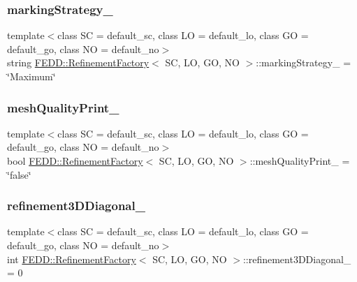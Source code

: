 \subsubsection{\texorpdfstring{marking\+Strategy\+\_\+}{markingStrategy\_}}
{\footnotesize\ttfamily template$<$class SC  = default\+\_\+sc, class LO  = default\+\_\+lo, class GO  = default\+\_\+go, class NO  = default\+\_\+no$>$ \\
string \hyperlink{classFEDD_1_1RefinementFactory}{F\+E\+D\+D\+::\+Refinement\+Factory}$<$ SC, LO, GO, NO $>$\+::marking\+Strategy\+\_\+ = \char`\"{}Maximum\char`\"{}}

\mbox{\label{classFEDD_1_1RefinementFactory_a74d0dd46b30f83f868cd749d28375a42}} 
\subsubsection{\texorpdfstring{mesh\+Quality\+Print\+\_\+}{meshQualityPrint\_}}
{\footnotesize\ttfamily template$<$class SC  = default\+\_\+sc, class LO  = default\+\_\+lo, class GO  = default\+\_\+go, class NO  = default\+\_\+no$>$ \\
bool \hyperlink{classFEDD_1_1RefinementFactory}{F\+E\+D\+D\+::\+Refinement\+Factory}$<$ SC, LO, GO, NO $>$\+::mesh\+Quality\+Print\+\_\+ = \char`\"{}false\char`\"{}}

\mbox{\label{classFEDD_1_1RefinementFactory_a7466053f06c1d52d6fb2c58db06b7a71}} 
\subsubsection{\texorpdfstring{refinement3\+D\+Diagonal\+\_\+}{refinement3DDiagonal\_}}
{\footnotesize\ttfamily template$<$class SC  = default\+\_\+sc, class LO  = default\+\_\+lo, class GO  = default\+\_\+go, class NO  = default\+\_\+no$>$ \\
int \hyperlink{classFEDD_1_1RefinementFactory}{F\+E\+D\+D\+::\+Refinement\+Factory}$<$ SC, LO, GO, NO $>$\+::refinement3\+D\+Diagonal\+\_\+ = 0}

